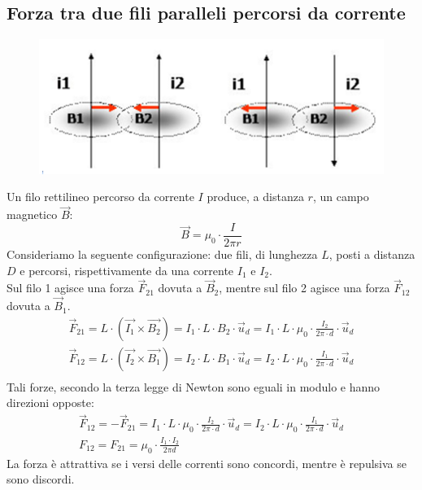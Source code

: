 \subsection{Forza tra due fili paralleli percorsi da corrente}
\begin{figure}[h!]
	\centering
    \includegraphics[scale=0.7]{fili-paralleli-corrente.png}
\end{figure}
Un filo rettilineo percorso da corrente $I$ produce, a distanza $r$, un campo magnetico $\vec{B}$:
\begin{displaymath}
	\vec{B} = \mu_0 \cdot \frac{I}{2\pi r}
\end{displaymath}
Consideriamo la seguente configurazione: due fili, di lunghezza $L$, posti a distanza $D$ e percorsi, rispettivamente da una corrente $I_1$ e $I_2$.\\
Sul filo 1 agisce una forza $\vec{F}_{21}$ dovuta a $\vec{B}_2$, mentre sul filo 2 agisce una forza $\vec{F}_{12}$ dovuta a $\vec{B}_1$.\\
\begin{displaymath}\begin{aligned}
	\vec{F}_{21} = L \cdot (\vec{I_1 } \times \vec{B_2}) = I_1 \cdot L \cdot B_2 \cdot \vec{u}_d = 
	I_1 \cdot L \cdot \mu_0 \cdot \frac{I_2}{2\pi \cdot d} \cdot \vec{u}_d\\
	\vec{F}_{12} = L \cdot (\vec{I_2} \times \vec{B_1}) = I_2 \cdot L \cdot B_1 \cdot \vec{u}_d = 
	I_2 \cdot L \cdot \mu_0 \cdot \frac{I_1}{2\pi \cdot d} \cdot \vec{u}_d\\
\end{aligned}\end{displaymath}
Tali forze, secondo la terza legge di Newton sono eguali in modulo e hanno direzioni opposte:
\begin{displaymath}\begin{aligned}
	\vec{F}_{12} = - \vec{F}_{21} =I_1 \cdot L \cdot \mu_0 \cdot \frac{I_2}{2\pi \cdot d} \cdot \vec{u}_d = I_2 \cdot L \cdot \mu_0 \cdot \frac{I_1}{2\pi \cdot d} \cdot \vec{u}_d\\
	F_{12}=F_{21} = \mu_0 \cdot \frac{I_1 \cdot I_2}{2 \pi d}
\end{aligned}\end{displaymath}
La forza è attrattiva se i versi delle correnti sono concordi, mentre è repulsiva se sono discordi.


